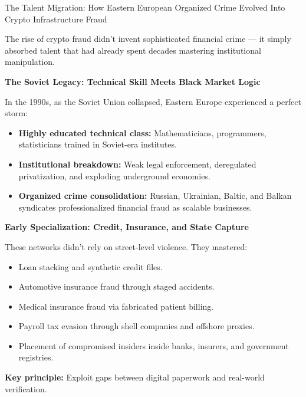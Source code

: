 \begin{HistoricalSidebar}{The Talent Migration: How Eastern European Organized Crime Evolved Into Crypto Infrastructure Fraud}

    The rise of crypto fraud didn't invent sophisticated financial crime — it simply absorbed talent that had already spent decades mastering institutional manipulation.

    \medskip
    
    \textbf{The Soviet Legacy: Technical Skill Meets Black Market Logic}
    
    In the 1990s, as the Soviet Union collapsed, Eastern Europe experienced a perfect storm:
    
    \begin{itemize}
        \item \textbf{Highly educated technical class:} Mathematicians, programmers, statisticians trained in Soviet-era institutes.
        \item \textbf{Institutional breakdown:} Weak legal enforcement, deregulated privatization, and exploding underground economies.
        \item \textbf{Organized crime consolidation:} Russian, Ukrainian, Baltic, and Balkan syndicates professionalized financial fraud as scalable businesses.
    \end{itemize}
    
    \medskip
    
    \textbf{Early Specialization: Credit, Insurance, and State Capture}
    
    These networks didn't rely on street-level violence. They mastered:
    
    \begin{itemize}
        \item Loan stacking and synthetic credit files.
        \item Automotive insurance fraud through staged accidents.
        \item Medical insurance fraud via fabricated patient billing.
        \item Payroll tax evasion through shell companies and offshore proxies.
        \item Placement of compromised insiders inside banks, insurers, and government registries.
    \end{itemize}
    
    \textbf{Key principle:}  
    Exploit gaps between digital paperwork and real-world verification.
    

\end{HistoricalSidebar}
